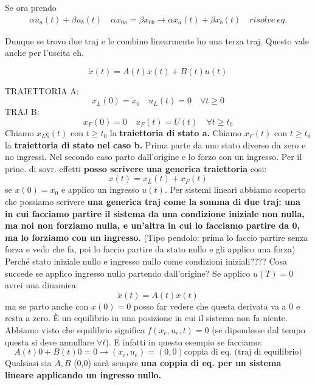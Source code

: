 \documentclass[a4paper]{report}
\begin{document}
Se ora prendo 
\begin{align*}
	\alpha u_a(t) + \beta u_b(t) \quad \alpha x_{0a} = \beta x_{0b} \rightarrow \alpha x_a(t) + \beta x_b(t) \quad risolve  \ eq.
\end{align*}


Dunque se trovo due traj e le combino linearmente ho una terza traj. Questo vale anche per l'uscita eh.

\newpage
\begin{equation*}
	\dot x(t) = A(t)x(t) + B(t)u(t)
\end{equation*}

TRAIETTORIA A: 
\begin{equation*}
	x_L(0)=x_0 \quad u_L(t)=0 \quad \forall t \geq 0
\end{equation*}
TRAJ B:
\begin{equation*}
	x_F(0)=0 \quad u_F(t)= U(t) \quad \forall t \geq t_0
\end{equation*}
Chiamo $x_Lç(t)$ con $t \geq t_0$ la \textbf{traiettoria di stato a.} Chiamo $x_F(t)$ con $t \geq t_0$ la \textbf{traiettoria di stato nel caso b.} Prima parte da uno stato diverso da zero e no ingressi. Nel secondo caso parto dall'origine e lo forzo con un ingresso.
\bb
Per il princ. di sovr. effetti \textbf{posso scrivere una generica traiettoria} cosi:
\begin{equation*}
	\boxed{x(t) = x_L(t)+x_F(t)}
\end{equation*}
se $x(0) = x_0$ e applico un ingresso $u(t).$ Per sistemi lineari abbiamo scoperto che possiamo scrivere \textbf{una generica traj come la somma di due traj: una in cui facciamo partire il sistema da una condizione iniziale non nulla, ma noi non forziamo nulla, e un'altra in cui lo facciamo partire da 0, ma lo forziamo con un ingresso.} (Tipo pendolo: prima lo faccio partire senza forza e vedo che fa, poi lo faccio partire da stato nullo e gli applico una forza)
\bb
Perché stato iniziale nullo e ingresso nullo come condizioni iniziali???? Cosa succede se applico ingresso nullo partendo dall'origine? Se applico $u(T) = 0$ avrei una dinamica:
\begin{equation*}
	\dot x(t) = A(t)x(t)
\end{equation*} ma se parto anche con $x(0) = 0$ posso far vedere che questa derivata va a 0 e resta a zero. È un equilibrio in una posizione in cui il sistema non fa niente. Abbiamo visto che equilibrio significa $f(x_e, u_e,t) = 0$ (se dipendesse dal tempo questa si deve annullare $\forall t$). E infatti in questo esempio se facciamo:
\begin{equation*}
	A(t) 0+B(t) 0 = 0 \rightarrow (x_e, u_e)=(0,0) \textrm{coppia di eq. (traj di equilibrio)}
\end{equation*}
Qualsiasi sia $A,B$ (0,0) sarà sempre \textbf{una coppia di eq. per un sistema lineare applicando un ingresso nullo.}
\end{document}
